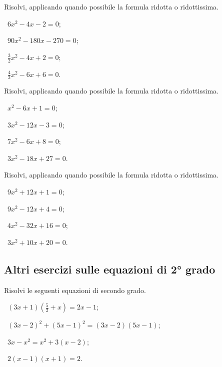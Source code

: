 \begin{esercizio}[\Ast]
 \label{ese:3.22}
Risolvi, applicando quando possibile la formula ridotta o ridottissima.
\begin{multicols}{2}
 \begin{enumeratea}
 \item~$6 x^{2}-4 x-2 = 0$;
 \item~$90 x^{2}-180 x-270 = 0$;
 \item~$\frac{3}{2} x^{2}-4 x + 2 = 0$;
 \item~$\frac{4}{3} x^{2}-6 x + 6 = 0$.
 \end{enumeratea}
 \end{multicols}
\end{esercizio}

\begin{esercizio}[\Ast]
\label{ese:3.23}
Risolvi, applicando quando possibile la formula ridotta o ridottissima.
\begin{multicols}{2}
 \begin{enumeratea}
 \item~$x^{2}-6 x + 1 = 0$;
 \item~$3 x^{2}-12 x-3 = 0$;
 \item~$7 x^{2}-6 x + 8 = 0$;
 \item~$3 x^{2}-18 x + 27 = 0$.
 \end{enumeratea}
 \end{multicols}
\end{esercizio}
\pagebreak
\begin{esercizio}[\Ast]
\label{ese:3.24}
Risolvi, applicando quando possibile la formula ridotta o ridottissima.
\begin{multicols}{2}
 \begin{enumeratea}
 \item~$9 x^{2} + 12 x + 1 = 0$;
 \item~$9 x^{2}-12 x + 4 = 0$;
 \item~$4 x^{2}-32 x + 16 = 0$;
 \item~$3 x^{2} + 10 x + 20 = 0$.
 \end{enumeratea}
 \end{multicols}
\end{esercizio}

\subsection*{Altri esercizi sulle equazioni di 2° grado}

\begin{esercizio}[\Ast]
\label{ese:3.25}
Risolvi le seguenti equazioni di secondo grado.
\begin{multicols}{2}
 \begin{enumeratea}
 \item~$(3 x + 1) \left(\frac{5}{2} + x \right) = 2 x-1$;
 \item~$(3 x-2)^{2} + (5 x-1)^{2} = (3 x-2) (5 x-1)$;
 \item~$3 x-x^{2} = x^{2} + 3 (x-2)$;
 \item~$2 (x-1) (x + 1) = 2$.
 \end{enumeratea}
 \end{multicols}
\end{esercizio}

